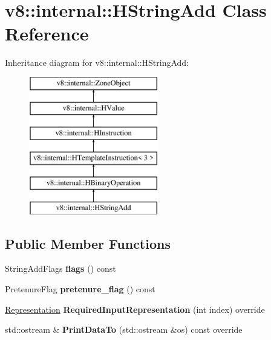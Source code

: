 \hypertarget{classv8_1_1internal_1_1_h_string_add}{}\section{v8\+:\+:internal\+:\+:H\+String\+Add Class Reference}
\label{classv8_1_1internal_1_1_h_string_add}
Inheritance diagram for v8\+:\+:internal\+:\+:H\+String\+Add\+:\begin{figure}[H]
\begin{center}
\leavevmode
\includegraphics[height=6.000000cm]{classv8_1_1internal_1_1_h_string_add}
\end{center}
\end{figure}
\subsection*{Public Member Functions}
\begin{DoxyCompactItemize}
\item 
String\+Add\+Flags {\bfseries flags} () const \hypertarget{classv8_1_1internal_1_1_h_string_add_a1a73809e5e16a6683913ba2e0ff28f97}{}\label{classv8_1_1internal_1_1_h_string_add_a1a73809e5e16a6683913ba2e0ff28f97}

\item 
Pretenure\+Flag {\bfseries pretenure\+\_\+flag} () const \hypertarget{classv8_1_1internal_1_1_h_string_add_a008e77f4d616f82b59f5900666abab42}{}\label{classv8_1_1internal_1_1_h_string_add_a008e77f4d616f82b59f5900666abab42}

\item 
\hyperlink{classv8_1_1internal_1_1_representation}{Representation} {\bfseries Required\+Input\+Representation} (int index) override\hypertarget{classv8_1_1internal_1_1_h_string_add_a2c13de5a7400f9104ce4b65b6d19b36b}{}\label{classv8_1_1internal_1_1_h_string_add_a2c13de5a7400f9104ce4b65b6d19b36b}

\item 
std\+::ostream \& {\bfseries Print\+Data\+To} (std\+::ostream \&os) const  override\hypertarget{classv8_1_1internal_1_1_h_string_add_ad5d746cb81607836dc0a22641bf55fef}{}\label{classv8_1_1internal_1_1_h_string_add_ad5d746cb81607836dc0a22641bf55fef}

\end{DoxyCompactItemize}
